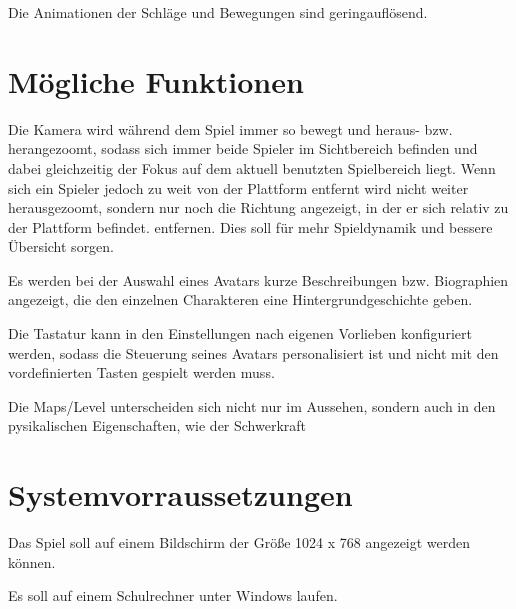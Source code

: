 \documentclass[11pt]{article}
\newcommand{\paragraphspace}{0.3cm}
\begin{document}
    \noindent
    Die Animationen der Schl\"age und Bewegungen sind geringaufl\"osend.



    \section{M\"ogliche Funktionen}\label{sec:kann}

    Die Kamera wird w\"ahrend dem Spiel immer so bewegt und heraus- bzw. herangezoomt, sodass sich immer beide
    Spieler im Sichtbereich befinden und dabei gleichzeitig der Fokus auf dem aktuell benutzten Spielbereich liegt. Wenn sich
    ein Spieler jedoch zu weit von der Plattform entfernt wird nicht weiter herausgezoomt, sondern nur noch die Richtung angezeigt,
    in der er sich relativ zu der Plattform befindet. entfernen. Dies soll f\"ur mehr Spieldynamik und bessere \"Ubersicht sorgen.
    \vspace{\paragraphspace}

    \noindent
    Es werden bei der Auswahl eines Avatars kurze Beschreibungen bzw. Biographien angezeigt, die den einzelnen Charakteren
    eine Hintergrundgeschichte geben.
    \vspace{\paragraphspace}

    \noindent
    Die Tastatur kann in den Einstellungen nach eigenen Vorlieben konfiguriert werden, sodass die Steuerung seines Avatars
    personalisiert ist und nicht mit den vordefinierten Tasten gespielt werden muss.
    \vspace{\paragraphspace}

    \noindent
    Die Maps/Level unterscheiden sich nicht nur im Aussehen, sondern auch in den pysikalischen Eigenschaften, wie der
    Schwerkraft

    \section{Systemvorraussetzungen}\label{sec:systemvorraussetungen}

    Das Spiel soll auf einem Bildschirm der Gr\"oße 1024 x 768 angezeigt werden k\"onnen.
    \vspace{\paragraphspace}

    \noindent
    Es soll auf einem Schulrechner unter Windows laufen.
\end{document}
